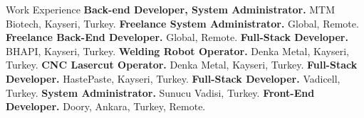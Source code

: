 \begin{rubric}{Work Experience}
	\entry*[2025 -- $\cdots$]\textbf{Back-end Developer, System Administrator.} MTM Biotech, Kayseri, Turkey.
	\entry*[2020 -- $\cdots$]\textbf{Freelance System Administrator.} Global, Remote.
	\entry*[2013 -- $\cdots$]\textbf{Freelance Back-End Developer.} Global, Remote.
	\entry*[2020 -- 2025]\textbf{Full-Stack Developer.} BHAPI, Kayseri, Turkey.
	\entry*[2023 -- 2024]\textbf{Welding Robot Operator.} Denka Metal, Kayseri, Turkey.
	\entry*[2023 -- 2023]\textbf{CNC Lasercut Operator.} Denka Metal, Kayseri, Turkey.
	\entry*[2020 -- 2022]\textbf{Full-Stack Developer.} HastePaste, Kayseri, Turkey.
	\entry*[2021 -- 2021]\textbf{Full-Stack Developer.} Vadicell, Turkey.
	\entry*[2021 -- 2021]\textbf{System Administrator.} Sunucu Vadisi, Turkey.
	\entry*[2020 -- 2020]\textbf{Front-End Developer.} Doory, Ankara, Turkey, Remote.
\end{rubric}
